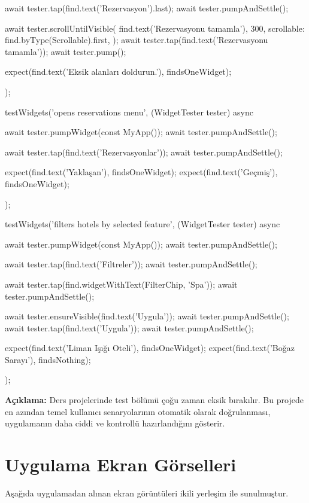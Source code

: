 \documentclass[11pt,a4paper]{article}
\begin{document}
\begin{codeblock}
{{    await tester.tap(find.text('Rezervasyon').last);
    await tester.pumpAndSettle();

    await tester.scrollUntilVisible(
      find.text('Rezervasyonu tamamla'),
      300,
      scrollable: find.byType(Scrollable).first,
    );
    await tester.tap(find.text('Rezervasyonu tamamla'));
    await tester.pump();

    expect(find.text('Eksik alanları doldurun.'), findsOneWidget);
  });

  testWidgets('opens reservations menu', (WidgetTester tester) async {
    await tester.pumpWidget(const MyApp());
    await tester.pumpAndSettle();

    await tester.tap(find.text('Rezervasyonlar'));
    await tester.pumpAndSettle();

    expect(find.text('Yaklaşan'), findsOneWidget);
    expect(find.text('Geçmiş'), findsOneWidget);
  });

  testWidgets('filters hotels by selected feature',
      (WidgetTester tester) async {
    await tester.pumpWidget(const MyApp());
    await tester.pumpAndSettle();

    await tester.tap(find.text('Filtreler'));
    await tester.pumpAndSettle();

    await tester.tap(find.widgetWithText(FilterChip, 'Spa'));
    await tester.pumpAndSettle();

    await tester.ensureVisible(find.text('Uygula'));
    await tester.pumpAndSettle();
    await tester.tap(find.text('Uygula'));
    await tester.pumpAndSettle();

    expect(find.text('Liman Işığı Oteli'), findsOneWidget);
    expect(find.text('Boğaz Sarayı'), findsNothing);
  });
}
\end{codeblock}

\textbf{Açıklama:} Ders projelerinde test bölümü çoğu zaman eksik bırakılır. Bu projede en azından temel kullanıcı senaryolarının otomatik olarak doğrulanması, uygulamanın daha ciddi ve kontrollü hazırlandığını gösterir.

\clearpage
\section{Uygulama Ekran Görselleri}
Aşağıda uygulamadan alınan ekran görüntüleri ikili yerleşim ile sunulmuştur.
\end{document}
